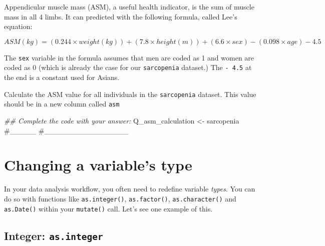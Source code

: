 \documentclass[
  letterpaper,
  DIV=11,
  numbers=noendperiod]{scrreprt}
\newenvironment{Shaded}{\begin{snugshade}}{\end{snugshade}}
\newcommand{\CommentTok}[1]{\textcolor[rgb]{0.37,0.37,0.37}{#1}}
\newcommand{\DocumentationTok}[1]{\textcolor[rgb]{0.37,0.37,0.37}{\textit{#1}}}
\newcommand{\NormalTok}[1]{\textcolor[rgb]{0.00,0.23,0.31}{#1}}
\newcommand{\OtherTok}[1]{\textcolor[rgb]{0.00,0.23,0.31}{#1}}
\begin{document}
\begin{tcolorbox}[enhanced jigsaw, colframe=quarto-callout-tip-color-frame, rightrule=.15mm, opacityback=0, breakable, coltitle=black, colbacktitle=quarto-callout-tip-color!10!white, bottomrule=.15mm, leftrule=.75mm, toprule=.15mm, arc=.35mm, bottomtitle=1mm, colback=white, left=2mm, opacitybacktitle=0.6, titlerule=0mm, title=\textcolor{quarto-callout-tip-color}{\faLightbulb}\hspace{0.5em}{Practice}, toptitle=1mm]

Appendicular muscle mass (ASM), a useful health indicator, is the sum of
muscle mass in all 4 limbs. It can predicted with the following formula,
called Lee's equation:

\[ASM(kg)= (0.244 \times weight(kg)) + (7.8 \times height(m)) + (6.6 \times sex) - (0.098 \times age) - 4.5\]

The \texttt{sex} variable in the formula assumes that men are coded as 1
and women are coded as 0 (which is already the case for our
\texttt{sarcopenia} dataset.) The \texttt{-\ 4.5} at the end is a
constant used for Asians.

Calculate the ASM value for all individuals in the \texttt{sarcopenia}
dataset. This value should be in a new column called \texttt{asm}

\begin{Shaded}
\begin{Highlighting}[]
\DocumentationTok{\#\# Complete the code with your answer:}
\NormalTok{Q\_asm\_calculation }\OtherTok{\textless{}{-}} 
\NormalTok{  sarcopenia }\CommentTok{\#\_\_\_\_\_}
  \CommentTok{\#\_\_\_\_\_\_\_\_\_\_\_\_\_\_\_\_}
\end{Highlighting}
\end{Shaded}

\end{tcolorbox}

\hypertarget{changing-a-variables-type}{%
\section{Changing a variable's type}\label{changing-a-variables-type}}

In your data analysis workflow, you often need to redefine variable
\emph{types}. You can do so with functions like \texttt{as.integer()},
\texttt{as.factor()}, \texttt{as.character()} and \texttt{as.Date()}
within your \texttt{mutate()} call. Let's see one example of this.

\hypertarget{integer-as.integer}{%
\subsection{\texorpdfstring{Integer:
\texttt{as.integer}}{Integer: as.integer}}\label{integer-as.integer}}
\end{document}

